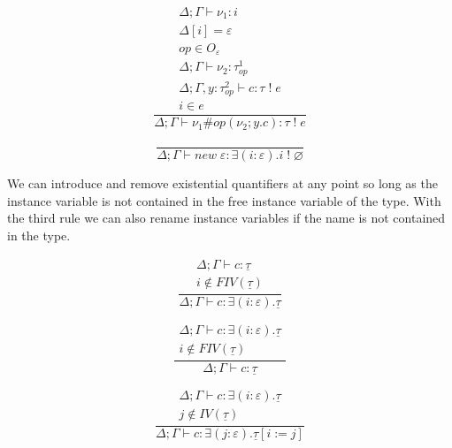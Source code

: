 \documentclass[12pt]{article}
\newcommand\eff[0]{\varepsilon}
\newcommand\Op[0]{O}
\newcommand\op[0]{op}
\newcommand\pty[1]{\ty^1_{#1}}
\newcommand\rty[1]{\ty^2_{#1}}
\newcommand\ty[0]{\tau}
\newcommand\cty[0]{\underline{\ty}}
\newcommand\aty[2]{#1 \; ! \; #2}
\newcommand\texists[3]{\exists(#1:#2) . #3}
\newcommand\val[0]{\nu}
\newcommand\comp[0]{c}
\newcommand\copi[5]{#1 \# #2(#3 ; #4 . #5)}
\newcommand\cnew[1]{\textit{new} \; #1}
\begin{document}
\begin{minipage}{0.5\textwidth}
\[\frac{
	\begin{array}{l}
	\Delta;\Gamma \vdash \val_1 : i \\
	\Delta[i] = \eff \\
	\op \in \Op_\eff\\
	\Delta;\Gamma \vdash \val_2 : \pty{\op} \\
	\Delta;\Gamma , y : \rty{\op} \vdash \comp : \aty{\ty}{e} \\
	i \in e
	\end{array}
}{
	\Delta;\Gamma \vdash \copi{\val_1}{\op}{\val_2}{y}{\comp} : \aty{\ty}{e}
}\]
\vspace{10pt}
\end{minipage}
\begin{minipage}{0.5\textwidth}
\[\frac{
}{
	\Delta;\Gamma \vdash \cnew{\eff} : \texists{i}{\eff}{\aty{i}{\varnothing}}
}\]
\vspace{10pt}
\end{minipage}

We can introduce and remove existential quantifiers at any point so long as the instance variable is not contained in the free instance variable of the type. With the third rule we can also rename instance variables if the name is not contained in the type. \\
\begin{minipage}{0.333\textwidth}
\[\frac{
	\begin{array}{l}
	\Delta;\Gamma \vdash c : \cty \\
	i \notin FIV(\cty)
	\end{array}
}{
	\Delta;\Gamma \vdash c : \texists{i}{\eff}{\cty}
}\]
\end{minipage}
\begin{minipage}{0.333\textwidth}
\[\frac{
	\begin{array}{l}
	\Delta;\Gamma \vdash c : \texists{i}{\eff}{\cty} \\
	i \notin FIV(\cty)
	\end{array}
}{
	\Delta;\Gamma \vdash c : \cty
}\]
\end{minipage}
\begin{minipage}{0.333\textwidth}
\[\frac{
	\begin{array}{l}
	\Delta;\Gamma \vdash c : \texists{i}{\eff}{\cty} \\
	j \notin IV(\cty)
	\end{array}
}{
	\Delta;\Gamma \vdash c : \texists{j}{\eff}{\cty[i := j]}
}\]
\end{minipage}
\end{document}
